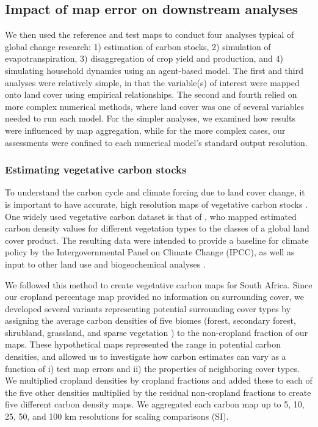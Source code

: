 \documentclass[a4paper]{article}
\begin{document}
\subsection*{Impact of map error on downstream analyses}
\vspace{-0.2 cm}
We then used the reference and test maps to conduct four analyses typical of global change research: 1) estimation of carbon stocks, 2) simulation of evapotranspiration, 3) disaggregation of crop yield and production, and 4) simulating household dynamics using an agent-based model. The first and third analyses were relatively simple, in that the variable(s) of interest were mapped onto land cover using empirical relationships. The second and fourth relied on more complex numerical methods, where land cover was one of several variables needed to run each model. For the simpler analyses, we examined how results were influenced by map aggregation, while for the more complex cases, our assessments were confined to each numerical model's standard output resolution. 

\vspace{-0.3 cm}
\subsubsection*{Estimating vegetative carbon stocks}
\vspace{-0.2 cm}
To understand the carbon cycle and climate forcing due to land cover change, it is important to have accurate, high resolution maps of vegetative carbon stocks \citep[][]{searchinger_high_2015}. One widely used vegetative carbon dataset is that of \citep{ruesch_new_2008}, who mapped estimated carbon density values for different vegetation types to the classes of a global land cover product. The resulting data were intended to provide a baseline for climate policy by the Intergovernmental Panel on Climate Change (IPCC), as well as input to other land use and biogeochemical analyses \citep{ruesch_new_2008}. 

We followed this method to create vegetative carbon maps for South Africa. Since our cropland percentage map provided no information on surrounding cover, we developed several variants representing potential surrounding cover types by assigning the average carbon densities of five biomes (forest, secondary forest, shrubland, grassland, and sparse vegetation \citep{ruesch_new_2008}) to the non-cropland fraction of our maps. These hypothetical maps represented the range in potential carbon densities, and allowed us to investigate how carbon estimates can vary as a function of i) test map errors and ii) the properties of neighboring cover types. We multiplied cropland densities by cropland fractions and added these to each of the five other densities multiplied by the residual non-cropland fractions to create five different carbon density maps. We aggregated each carbon map up to 5, 10, 25, 50, and 100 km resolutions for scaling comparisons (SI). 
\end{document}
